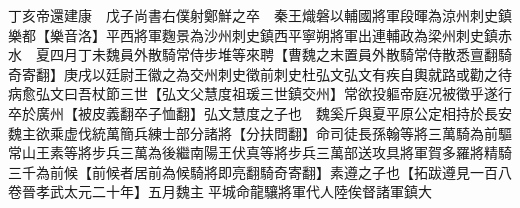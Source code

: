 丁亥帝還建康　戊子尚書右僕射鄭鮮之卒　秦王熾磐以輔國將軍段暉為涼州刺史鎮樂都【樂音洛】平西將軍麴景為沙州刺史鎮西平寧朔將軍出連輔政為梁州刺史鎮赤水　夏四月丁未魏員外散騎常侍步堆等來聘【曹魏之末置員外散騎常侍散悉亶翻騎奇寄翻】庚戌以廷尉王徽之為交州刺史徵前刺史杜弘文弘文有疾自輿就路或勸之待病愈弘文曰吾杖節三世【弘文父慧度祖瑗三世鎮交州】常欲投軀帝庭况被徵乎遂行卒於廣州【被皮義翻卒子恤翻】弘文慧度之子也　魏奚斤與夏平原公定相持於長安魏主欲乘虚伐統萬簡兵練士部分諸將【分扶問翻】命司徒長孫翰等將三萬騎為前驅常山王素等將步兵三萬為後繼南陽王伏真等將步兵三萬部送攻具將軍賀多羅將精騎三千為前候【前候者居前為候騎將即亮翻騎奇寄翻】素遵之子也【拓跋遵見一百八卷晉孝武太元二十年】五月魏主平城命龍驤將軍代人陸俟督諸軍鎮大